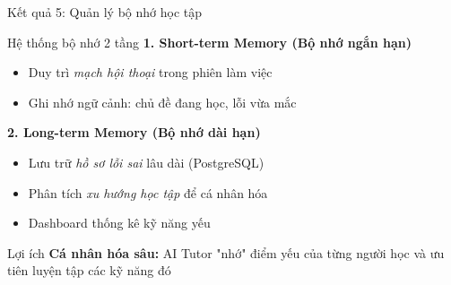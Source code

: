 \documentclass[notheorems,hyperref={bookmarks=true}]{beamer}
\begin{document}
\begin{frame}{Kết quả 5: Quản lý bộ nhớ học tập}
\begin{block}{Hệ thống bộ nhớ 2 tầng}
    \textbf{1. Short-term Memory (Bộ nhớ ngắn hạn)}
    \begin{itemize}
        \item Duy trì \textit{mạch hội thoại} trong phiên làm việc
        \item Ghi nhớ ngữ cảnh: chủ đề đang học, lỗi vừa mắc
    \end{itemize}
    
    \vspace{0.2cm}
    
    \textbf{2. Long-term Memory (Bộ nhớ dài hạn)}
    \begin{itemize}
        \item Lưu trữ \textit{hồ sơ lỗi sai} lâu dài (PostgreSQL)
        \item Phân tích \textit{xu hướng học tập} để cá nhân hóa
        \item Dashboard thống kê kỹ năng yếu
    \end{itemize}
\end{block}

\vspace{0.3cm}

\begin{alertblock}{Lợi ích}
    \textbf{Cá nhân hóa sâu:} AI Tutor "nhớ" điểm yếu của từng người học và ưu tiên luyện tập các kỹ năng đó
\end{alertblock}
\end{frame}
\end{document}
